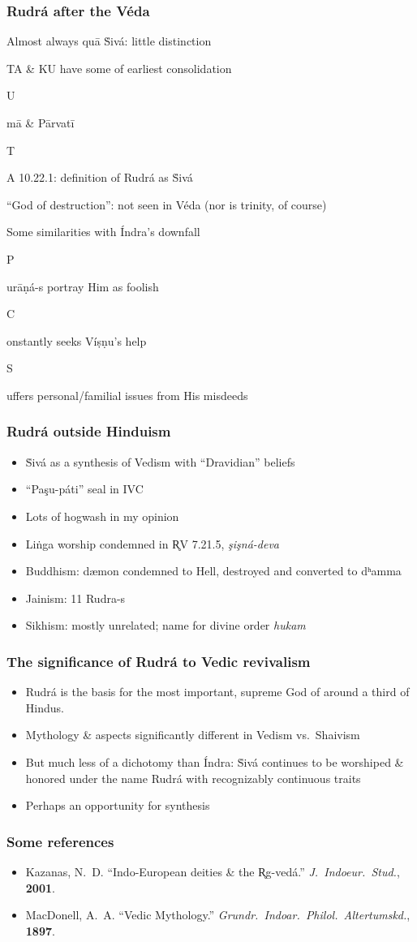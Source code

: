 \documentclass[pdf]{beamer}
\newcommand{\Subitem}[1]{{\setlength\itemindent{12pt} \item[-] #1}}
\begin{document}
\begin{frame} \frametitle{Rudrá after the Véda}
\begin{itemize}
	\item Almost always quā Ṡivá: little distinction
	\item TA \& KU have some of earliest consolidation
	\Subitem Umā \& Pārvatī
	\Subitem TA 10.22.1: definition of Rudrá as Ṡivá
	\item ``God of destruction'': not seen in Véda (nor is trinity, of course)
	\item Some similarities with Índra's downfall
	\Subitem Purāṇá-s portray Him as foolish
	\Subitem Constantly seeks Víṣṇu's help
	\Subitem Suffers personal/familial issues from His misdeeds
\end{itemize}
\end{frame}

\begin{frame} \frametitle{Rudrá outside Hinduism}
\begin{itemize}
	\item Ṡivá as a synthesis of Vedism with ``Dravidian'' beliefs
	\item ``Paşu-páti'' seal in IVC
	\item Lots of hogwash in my opinion
	\item Liṅga worship condemned in R̥V 7.21.5, \textit{şişná-deva}
	\item Buddhism: dæmon condemned to Hell, destroyed and converted to dʰamma
	\item Jainism: 11 Rudra-s
	\item Sikhism: mostly unrelated; name for divine order \textit{hukam}
\end{itemize}
\end{frame}

\begin{frame} \frametitle{The significance of Rudrá to Vedic revivalism}
\begin{itemize}
	\item Rudrá is the basis for the most important, supreme God of around a third of Hindus.
	\item Mythology \& aspects significantly different in Vedism vs.~Shaivism
	\item But much less of a dichotomy than Índra: Ṡivá continues to be worshiped \& honored under the name Rudrá with recognizably continuous traits
	\item Perhaps an opportunity for synthesis
\end{itemize}
\end{frame}


\begin{frame} \frametitle{Some references}
\begin{itemize}
	\item Kazanas, N.~D. ``Indo-European deities \& the R̥g-vedá.'' \textit{J.~Indoeur.~Stud.}, \textbf{2001}.
	\item MacDonell, A.~A. ``Vedic Mythology.'' \textit{Grundr.~Indoar.~Philol.~Altertumskd.}, \textbf{1897}.
\end{itemize}
\end{frame}
\end{document}
